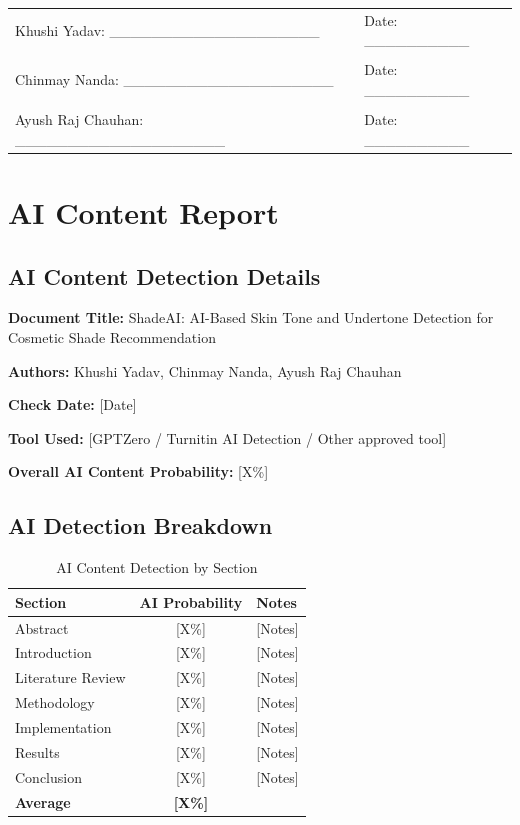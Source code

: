 \begin{tabular}{ll}
Khushi Yadav: \_\_\_\_\_\_\_\_\_\_\_\_\_\_\_\_\_\_\_\_ & Date: \_\_\_\_\_\_\_\_\_\_ \\
\\
Chinmay Nanda: \_\_\_\_\_\_\_\_\_\_\_\_\_\_\_\_\_\_\_\_ & Date: \_\_\_\_\_\_\_\_\_\_ \\
\\
Ayush Raj Chauhan: \_\_\_\_\_\_\_\_\_\_\_\_\_\_\_\_\_\_\_\_ & Date: \_\_\_\_\_\_\_\_\_\_ \\
\end{tabular}

\newpage

\section{AI Content Report}

\subsection{AI Content Detection Details}

\textbf{Document Title:} ShadeAI: AI-Based Skin Tone and Undertone Detection for Cosmetic Shade Recommendation

\textbf{Authors:} Khushi Yadav, Chinmay Nanda, Ayush Raj Chauhan

\textbf{Check Date:} [Date]

\textbf{Tool Used:} [GPTZero / Turnitin AI Detection / Other approved tool]

\textbf{Overall AI Content Probability:} [X\%]

\subsection{AI Detection Breakdown}

\begin{table}[h]
\centering
\begin{tabular}{|l|c|p{6cm}|}
\hline
\textbf{Section} & \textbf{AI Probability} & \textbf{Notes} \\
\hline
Abstract & [X\%] & [Notes] \\
Introduction & [X\%] & [Notes] \\
Literature Review & [X\%] & [Notes] \\
Methodology & [X\%] & [Notes] \\
Implementation & [X\%] & [Notes] \\
Results & [X\%] & [Notes] \\
Conclusion & [X\%] & [Notes] \\
\hline
\textbf{Average} & \textbf{[X\%]} & \\
\hline
\end{tabular}
\caption{AI Content Detection by Section}
\end{table}


